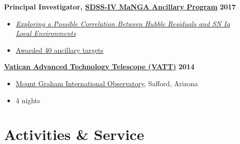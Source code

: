 \documentclass[margin]{res}
\begin{document}
\begin{resume}
{\bf Principal Investigator, \href{http://www.sdss.org/dr13/manga/}{SDSS-IV MaNGA Ancillary Program}} \hfill \textbf{2017} 
\begin{itemize} \itemsep -2pt %
     \item[] \href{https://trac.sdss.org/wiki/MANGA/Survey/AncillaryPrograms2017/Rose_SNIa_Environments_and_HR}{\textit{Exploring a Possible Correlation Between Hubble Residuals and SN Ia\\Local Environments}}
     \item[]\href{http://www.sdss.org/dr14/manga/manga-target-selection/ancillary-targets/}{Awarded 40 ancillary targets}
     \end{itemize} \vspace{-12pt}
{\href{http://vaticanobservatory.org/VATT/}{\bf  Vatican Advanced Technology Telescope (VATT)}} \hfill \textbf{2014}
\begin{itemize} \itemsep -2pt %
     \item[] \href{http://mgio.arizona.edu}{Mount Graham International Observatory}, Safford, Arizona
     \item[]4 nights
     \end{itemize} 




\section{Activities \& Service} %



\end{resume}
\end{document}

